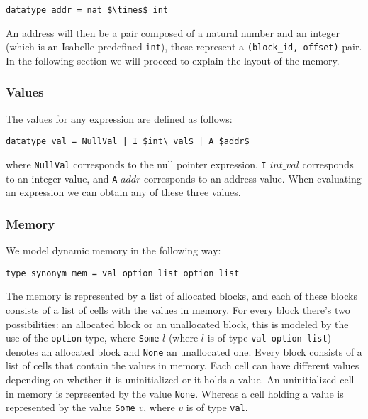 \begin{lstlisting}[frame=single, mathescape=true]
datatype addr = nat $\times$ int
\end{lstlisting}

An address will then be a pair composed of a natural number and an integer (which is an Isabelle predefined \verb|int|), these represent a \verb|(block_id, offset)| pair.
In the following section we will proceed to explain the layout of the memory.

\subsubsection{Values} The values for any expression are defined as follows:

\begin{lstlisting}[frame=single, mathescape=true]
datatype val = NullVal | I $int\_val$ | A $addr$
\end{lstlisting}

where \verb|NullVal| corresponds to the null pointer expression, \verb|I| $int\_val$ corresponds to an integer value, and \verb|A| $addr$ corresponds to an address value.
When evaluating an expression we can obtain any of these three values.

\subsubsection{Memory}

We model dynamic memory in the following way:

\begin{lstlisting}[frame=single, mathescape=true]
type_synonym mem = val option list option list
\end{lstlisting}

The memory is represented by a list of allocated blocks, and each of these blocks consists of a list of cells with the values in memory.
For every block there's two possibilities: an allocated block or an unallocated block, this is modeled by the use of the \verb|option| type, where \verb|Some| $l$ (where $l$ is of type \verb|val option list|) denotes an allocated block and \verb|None| an unallocated one.
Every block consists of a list of cells that contain the values in memory.
Each cell can have different values depending on whether it is uninitialized or it holds a value.
An uninitialized cell in memory is represented by the value \verb|None|.
Whereas a cell holding a value is represented by the value \verb|Some| $v$, where $v$ is of type \verb|val|.

